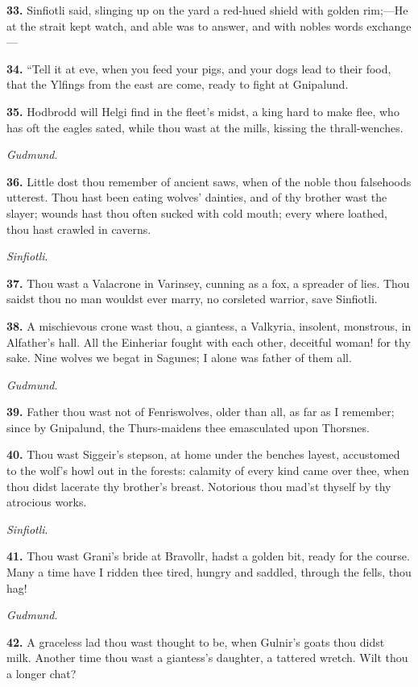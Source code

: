 \textbf{33.} Sinfiotli said, slinging up on the yard a red-hued shield with
golden rim;—He at the strait kept watch, and able was to answer, and
with nobles words exchange—

\textbf{34.} ``Tell it at eve, when you feed your pigs, and your dogs lead to
their food, that the Ylfings from the east are come, ready to fight at
Gnipalund.

\textbf{35.} Hodbrodd will Helgi find in the fleet's midst, a king hard to
make flee, who has oft the eagles sated, while thou wast at the mills,
kissing the thrall-wenches.

\emph{Gudmund}.

\textbf{36.} Little dost thou remember of ancient saws, when of the noble
thou falsehoods utterest. Thou hast been eating wolves' dainties, and
of thy brother wast the slayer; wounds hast thou often sucked with
cold mouth; every where loathed, thou hast crawled in caverns.

\emph{Sinfiotli}.

\textbf{37.} Thou wast a Valacrone in Varinsey, cunning as a fox, a spreader
of lies. Thou saidst thou no man wouldst ever marry, no corsleted
warrior, save Sinfiotli.

\textbf{38.} A mischievous crone wast thou, a giantess, a Valkyria, insolent,
monstrous, in Alfather's hall. All the Einheriar fought with each
other, deceitful woman! for thy sake. Nine wolves we begat in Sagunes;
I alone was father of them all.

\emph{Gudmund}.

\textbf{39.} Father thou wast not of Fenriswolves, older than all, as far as
I remember; since by Gnipalund, the Thurs-maidens thee emasculated
upon Thorsnes.

\textbf{40.} Thou wast Siggeir's stepson, at home under the benches layest,
accustomed to the wolf's howl out in the forests: calamity of every
kind came over thee, when thou didst lacerate thy brother's breast.
Notorious thou mad'st thyself by thy atrocious works.

\emph{Sinfiotli}.

\textbf{41.} Thou wast Grani's bride at Bravollr, hadst a golden bit, ready
for the course. Many a time have I ridden thee tired, hungry and
saddled, through the fells, thou hag!

\emph{Gudmund}.

\textbf{42.} A graceless lad thou wast thought to be, when Gulnir's goats
thou didst milk. Another time thou wast a giantess's daughter, a
tattered wretch. Wilt thou a longer chat?

